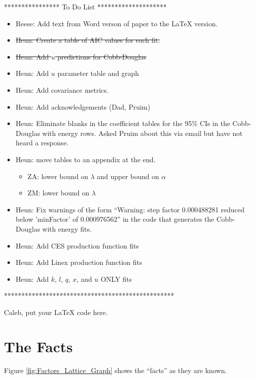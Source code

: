 \documentclass[preprint,authoryear,12pt]{elsarticle}\usepackage{graphicx, color}
\begin{document}
**************** To Do List ********************
\begin{itemize}
\item Reese: Add text from Word verson of paper to the LaTeX version.
\item \st{Heun: Create a table of AIC values for each fit.}
\item \st{Heun: Add $u$ predictions for Cobb-Douglas}
\item Heun: Add $u$ parameter table and graph
\item Heun: Add covariance metrics.
\item Heun: Add acknowledgements (Dad, Pruim)
\item Heun: Eliminate blanks in the coefficient tables for the 95\% CIs in the Cobb-Douglas with energy rows. Asked Pruim about this via email but have not heard a response.
\item Heun: move tables to an appendix at the end.
      \begin{itemize}
      \item ZA: lower bound on $\lambda$ and upper bound on $\alpha$
      \item ZM: lower bound on $\lambda$
      \end{itemize}
\item Heun: Fix warnings of the form ``Warning:  step factor 0.000488281 reduced below ’minFactor’ of 0.000976562'' in the code that generates the Cobb-Douglas with energy fits.
\item Heun: Add CES production function fits
\item Heun: Add Linex production function fits
\item Heun: Add $k$, $l$, $q$, $x$, and $u$ ONLY fits
\end{itemize}
*************************************************

Caleb, put your LaTeX code here.









\section{The Facts}

Figure \ref{fig:Factors_Lattice_Graph} shows the ``facts'' as they are known.
\end{document}

